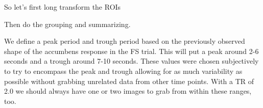 \documentclass[
]{article}
\newenvironment{Shaded}{\begin{snugshade}}{\end{snugshade}}
\newcommand{\ControlFlowTok}[1]{\textcolor[rgb]{0.13,0.29,0.53}{\textbf{#1}}}
\newcommand{\DataTypeTok}[1]{\textcolor[rgb]{0.13,0.29,0.53}{#1}}
\newcommand{\KeywordTok}[1]{\textcolor[rgb]{0.13,0.29,0.53}{\textbf{#1}}}
\newcommand{\NormalTok}[1]{#1}
\newcommand{\OperatorTok}[1]{\textcolor[rgb]{0.81,0.36,0.00}{\textbf{#1}}}
\newcommand{\StringTok}[1]{\textcolor[rgb]{0.31,0.60,0.02}{#1}}
\begin{document}
So let's first long transform the ROIs

Then do the grouping and summarizing.

We define a peak period and trough period based on the previously
observed shape of the accumbens response in the FS trial. This will put
a peak around 2-6 seconds and a trough around 7-10 seconds. These values
were chosen subjectively to try to encompass the peak and trough
allowing for as much variability as possible without grabbing unrelated
data from other time points. With a TR of 2.0 we should always have one
or two images to grab from within these ranges, too.

\begin{Shaded}
\begin{Highlighting}[]
\ControlFlowTok{if}\NormalTok{(}\OperatorTok{!}\NormalTok{loaded_from_cache)\{}
\NormalTok{  tpc_long<-time_points_c }\OperatorTok{%
  
}
\end{Highlighting}
\end{Shaded}
\end{document}
